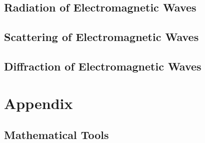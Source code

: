 \documentclass[
    ebook,
    11pt,
    twoside,
    onecolumn,
    openright,
    final
]{memoir}
\begin{document}
\chapter{Radiation of Electromagnetic Waves}

\chapter{Scattering of Electromagnetic Waves}

\chapter{Diffraction of Electromagnetic Waves}

\appendix
\part{Appendix}

\chapter{Mathematical Tools}

\backmatter
\end{document}
